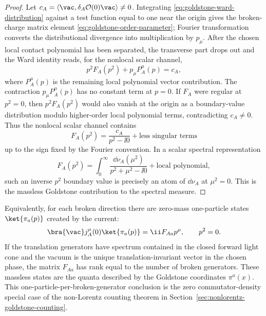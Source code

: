 \begin{proof}
Let \(c_A=\langle\vac,\delta_A\mathcal O(0)\vac\rangle\neq0\).
Integrating \eqref{eq:goldstone-ward-distribution} against a test function
equal to one near the origin gives the broken-charge matrix element
\eqref{eq:goldstone-order-parameter}; Fourier transformation converts the
distributional divergence into multiplication by \(p_\mu\).  After the chosen
local contact polynomial has been separated, the transverse part drops out and
the Ward identity reads, for the nonlocal scalar channel,
\[
  p^2F_A(p^2)+p_\mu P_A^\mu(p)=c_A ,
\]
where \(P_A^\mu(p)\) is the remaining local polynomial vector contribution.
The contraction \(p_\mu P_A^\mu(p)\) has no constant term at \(p=0\).  If
\(F_A\) were regular at \(p^2=0\), then \(p^2F_A(p^2)\) would also vanish at
the origin as a boundary-value distribution modulo higher-order local
polynomial terms, contradicting \(c_A\neq0\).  Thus the nonlocal scalar channel
contains
\[
  F_A(p^2)=\frac{c_A}{p^2-\ii0}+\text{less singular terms}
\]
up to the sign fixed by the Fourier convention.  In a scalar spectral
representation
\[
  F_A(p^2)=
  \int_{0}^{\infty}\frac{\dd\nu_A(\mu^2)}{p^2+\mu^2-\ii0}
  +\text{local polynomial},
\]
such an inverse \(p^2\) boundary value is precisely an atom of \(\dd\nu_A\) at
\(\mu^2=0\).  This is the massless Goldstone contribution to the spectral
measure.
\end{proof}

Equivalently, for each broken direction there are zero-mass one-particle
states \(\ket{\pi_a(p)}\) created by the current:
\begin{equation}
  \bra{\vac}j_A^\mu(0)\ket{\pi_a(p)}
  =
  \ii F_{Aa}p^\mu,
  \qquad p^2=0 .
  \label{eq:goldstone-current-matrix-element}
\end{equation}
If the translation generators have spectrum contained in the closed forward
light cone and the vacuum is the unique translation-invariant vector in the
chosen phase, the matrix \(F_{Aa}\) has rank equal to the number of broken
generators.  These massless states are the quanta described by the Goldstone
coordinates \(\pi^a(x)\).  This one-particle-per-broken-generator conclusion
is the zero commutator-density special case of the non-Lorentz counting
theorem in Section~\ref{sec:nonlorentz-goldstone-counting}.

